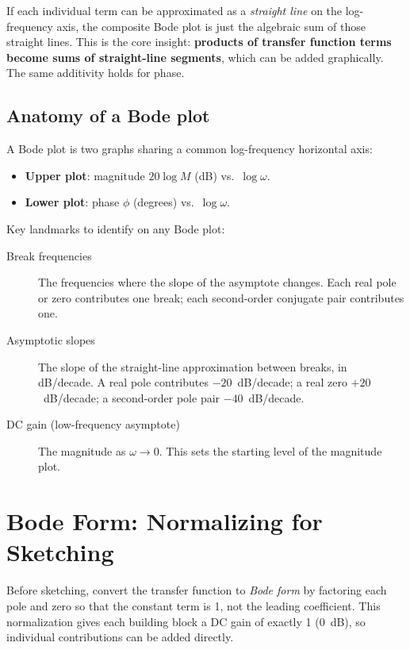 \documentclass[../../book.tex]{subfiles}
\begin{document}
If each individual term can be approximated as a \emph{straight line} on the
log-frequency axis, the composite Bode plot is just the algebraic sum of those
straight lines.  This is the core insight: \textbf{products of transfer
function terms become sums of straight-line segments}, which can be added
graphically.  The same additivity holds for phase.

\subsection{Anatomy of a Bode plot}
\label{sec:anatomy}

A Bode plot is two graphs sharing a common log-frequency horizontal axis:
\begin{itemize}
  \item \textbf{Upper plot}: magnitude $20\log M$ (dB) vs.\ $\log\omega$.
  \item \textbf{Lower plot}: phase $\phi$ (degrees) vs.\ $\log\omega$.
\end{itemize}

Key landmarks to identify on any Bode plot:
\begin{description}
  \item[Break frequencies] The frequencies where the slope of the asymptote
    changes.  Each real pole or zero contributes one break; each second-order
    conjugate pair contributes one.
  \item[Asymptotic slopes] The slope of the straight-line approximation between
    breaks, in dB/decade.  A real pole contributes $-20$~dB/decade; a real
    zero $+20$~dB/decade; a second-order pole pair $-40$~dB/decade.
  \item[DC gain (low-frequency asymptote)] The magnitude as $\omega \to 0$.
    This sets the starting level of the magnitude plot.
\end{description}

\section{Bode Form: Normalizing for Sketching}
\label{sec:bode_form}

Before sketching, convert the transfer function to \emph{Bode form} by
factoring each pole and zero so that the constant term is 1, not the leading
coefficient.  This normalization gives each building block a DC gain of exactly
1 (0~dB), so individual contributions can be added directly.
\end{document}
